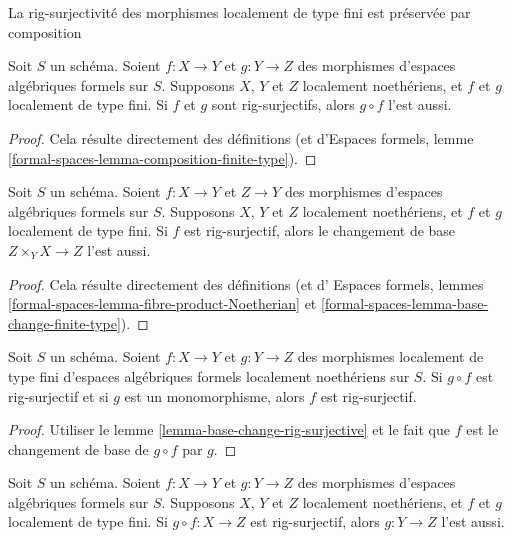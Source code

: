 \begin{lemma}
\label{lemma-composition-rig-surjective}
\begin{slogan}
La rig-surjectivité des morphismes localement de type fini est préservée par
composition
\end{slogan}
Soit $S$ un schéma. Soient $f : X \to Y$ et $g : Y \to Z$ des morphismes d'espaces
algébriques formels sur $S$. Supposons $X$, $Y$ et $Z$ localement noethériens,
et $f$ et $g$ localement de type fini. Si $f$ et $g$ sont rig-surjectifs,
alors $g \circ f$ l'est aussi.
\end{lemma}

\begin{proof}
Cela résulte directement des définitions
(et d'Espaces formels, lemme \ref{formal-spaces-lemma-composition-finite-type}).
\end{proof}

\begin{lemma}
\label{lemma-base-change-rig-surjective}
Soit $S$ un schéma. Soient $f : X \to Y$ et $Z \to Y$ des morphismes
d'espaces algébriques formels sur $S$. Supposons $X$, $Y$ et $Z$ localement
noethériens, et $f$ et $g$ localement de type fini. Si $f$ est
rig-surjectif, alors le changement de base $Z \times_Y X \to Z$ l'est aussi.
\end{lemma}

\begin{proof}
Cela résulte directement des définitions (et d'
Espaces formels, lemmes \ref{formal-spaces-lemma-fibre-product-Noetherian} et
\ref{formal-spaces-lemma-base-change-finite-type}).
\end{proof}

\begin{lemma}
\label{lemma-rig-surjective-alternative-permanence}
Soit $S$ un schéma. Soient $f : X \to Y$ et $g : Y \to Z$
des morphismes localement de type fini d'espaces algébriques formels
localement noethériens sur $S$. Si $g \circ f$ est rig-surjectif
et si $g$ est un monomorphisme, alors $f$ est rig-surjectif.
\end{lemma}

\begin{proof}
Utiliser le lemme \ref{lemma-base-change-rig-surjective} et le fait que
$f$ est le changement de base de $g \circ f$ par $g$.
\end{proof}

\begin{lemma}
\label{lemma-permanence-rig-surjective}
Soit $S$ un schéma. Soient $f : X \to Y$ et $g : Y \to Z$ des morphismes d'espaces
algébriques formels sur $S$. Supposons $X$, $Y$ et $Z$ localement noethériens,
et $f$ et $g$ localement de type fini. Si $g \circ f : X \to Z$
est rig-surjectif, alors $g : Y \to Z$ l'est aussi.
\end{lemma}

